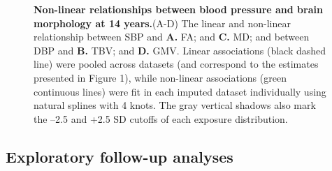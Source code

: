 \documentclass[
  letterpaper,
  DIV=11,
  numbers=noendperiod]{scrreport}
\begin{document}
\begin{figure}[H]


\caption{\label{fig-7.2}\textbf{Non-linear relationships between blood
pressure and brain morphology at 14 years.}\newline(A-D) The linear and
non-linear relationship between SBP and \textbf{A.} FA; and \textbf{C.}
MD; and between DBP and \textbf{B.} TBV; and \textbf{D.} GMV. Linear
associations (black dashed line) were pooled across datasets (and
correspond to the estimates presented in Figure 1), while non-linear
associations (green continuous lines) were fit in each imputed dataset
individually using natural splines with 4 knots. The gray vertical
shadows also mark the --2.5 and +2.5 SD cutoffs of each exposure
distribution.}

\end{figure}%

\subsection{Exploratory follow-up
analyses}\label{exploratory-follow-up-analyses}
\end{document}
